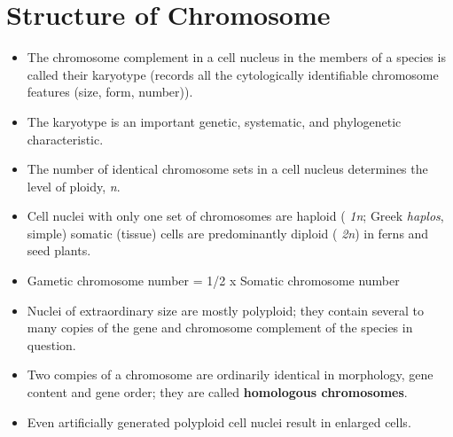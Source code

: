 \documentclass[11pt,ignorenonframetext,aspectratio=169]{beamer}
\providecommand{\tightlist}{%
  \setlength{\itemsep}{0pt}\setlength{\parskip}{0pt}}
\begin{document}
\hypertarget{structure-of-chromosome}{%
\section{Structure of Chromosome}\label{structure-of-chromosome}}

\begin{frame}{}
\protect\hypertarget{section-1}{}
\begin{itemize}
\tightlist
\item
  The chromosome complement in a cell nucleus in the members of a
  species is called their karyotype (records all the cytologically
  identifiable chromosome features (size, form, number)).
\item
  The karyotype is an important genetic, systematic, and phylogenetic
  characteristic.
\item
  The number of identical chromosome sets in a cell nucleus determines
  the level of ploidy, \emph{n}.
\item
  Cell nuclei with only one set of chromosomes are haploid ( \emph{1n};
  Greek \emph{haplos}, simple) somatic (tissue) cells are predominantly
  diploid ( \emph{2n}) in ferns and seed plants.
\item
  Gametic chromosome number = 1/2 x Somatic chromosome number
\item
  Nuclei of extraordinary size are mostly polyploid; they contain
  several to many copies of the gene and chromosome complement of the
  species in question.
\item
  Two compies of a chromosome are ordinarily identical in morphology,
  gene content and gene order; they are called \textbf{homologous
  chromosomes}.
\item
  Even artificially generated polyploid cell nuclei result in enlarged
  cells.
\end{itemize}
\end{frame}
\end{document}
